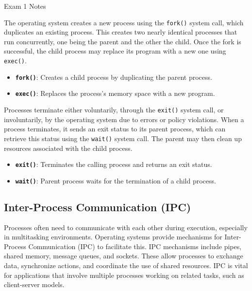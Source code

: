 \begin{examnotes}{Exam 1 Notes}
    \begin{highlight}
        The operating system creates a new process using the \texttt{fork()} system call, which duplicates an existing process. This creates two nearly identical processes that run concurrently, one 
        being the parent and the other the child. Once the fork is successful, the child process may replace its program with a new one using \texttt{exec()}.
        \begin{itemize}
            \item \textbf{\texttt{fork()}}: Creates a child process by duplicating the parent process.
            \item \textbf{\texttt{exec()}}: Replaces the process's memory space with a new program.
        \end{itemize}
    \end{highlight}
    
    \begin{highlight}
        Processes terminate either voluntarily, through the \texttt{exit()} system call, or involuntarily, by the operating system due to errors or policy violations. When a process terminates, it 
        sends an exit status to its parent process, which can retrieve this status using the \texttt{wait()} system call. The parent may then clean up resources associated with the child process.
        \begin{itemize}
            \item \textbf{\texttt{exit()}}: Terminates the calling process and returns an exit status.
            \item \textbf{\texttt{wait()}}: Parent process waits for the termination of a child process.
        \end{itemize}
    \end{highlight}
    
    \subsection*{Inter-Process Communication (IPC)}
    
    Processes often need to communicate with each other during execution, especially in multitasking environments. Operating systems provide mechanisms for Inter-Process Communication (IPC) to facilitate 
    this. IPC mechanisms include pipes, shared memory, message queues, and sockets. These allow processes to exchange data, synchronize actions, and coordinate the use of shared resources. IPC is vital 
    for applications that involve multiple processes working on related tasks, such as client-server models.
    

\end{examnotes}
